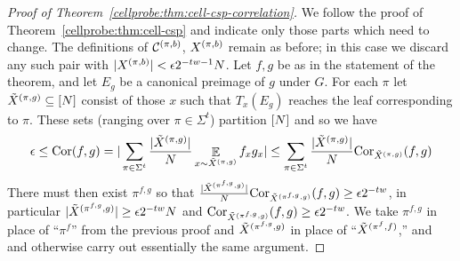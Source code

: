 \begin{proof}[Proof of Theorem~\ref{cellprobe:thm:cell-csp-correlation}]
We follow the proof of Theorem~\ref{cellprobe:thm:cell-csp} and indicate only those parts which need to change. The definitions of $\mathcal{C}^{(\pi,b)}$, $X^{(\pi,b)}$ remain as before; in this case we discard any such pair with $|X^{(\pi,b)}| < \epsilon2^{-tw-1}N$. Let $f,g$ be as in the statement of the theorem, and let $E_{g}$ be a canonical preimage of $g$ under $G$. For each $\pi$ let $
\tilde{X}^{(\pi,g)} \subseteq [N] $ consist of those $x$ such that $T_x(E_{g})$ reaches the leaf corresponding to $\pi$. These sets (ranging over $\pi\in \Sigma^t$) partition $[N]$ and so we have
\[
\epsilon \leq \mathrm{Cor}(f,g)  = |\sum_{\pi\in \Sigma^t} \frac{|\tilde{X}^{(\pi,g)}|}{N} \mathop{\mathbb{E}}\limits_{x \sim \tilde{X}^{(\pi,g)}} f_xg_x|  \leq \sum_{\pi\in \Sigma^t} \frac{|\tilde{X}^{(\pi,g)}|}{N} \mathrm{Cor}_{\tilde{X}^{(\pi,g)}}(f,g)
\]
There must then exist $\pi^{f,g}$ so that $ \frac{|\tilde{X}^{(\pi^{f,g},g)}|}{N} \mathrm{Cor}_{\tilde{X}^{(\pi^{f,g},g)}}(f,g) \geq \epsilon 2^{-tw}$, in particular $|\tilde{X}^{(\pi^{f,g},g)}| \geq \epsilon 2^{-tw} N$ and $\mathrm{Cor}_{\tilde{X}^{(\pi^{f,g},g)}}(f,g) \geq \epsilon 2^{-tw}$. 
We take $\pi^{f,g}$ in place of ``$\pi^f$'' from the previous proof and $\tilde{X}^{(\pi^{f,g},g)}$ in place of ``$\tilde{X}^{(\pi^f,f)}$,'' and  and otherwise carry out essentially the same argument.


\end{proof}
